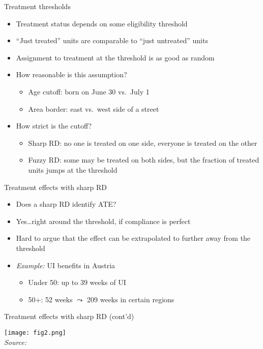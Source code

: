 \documentclass[aspectratio=169,compress,handout,t,xcolor=table]{beamer}
\begin{document}
\begin{frame}{Treatment thresholds}
  \begin{itemize}
    \item Treatment status depends on some eligibility threshold
    \item ``Just treated'' units are comparable to ``just untreated'' units
    \item Assignment to treatment at the threshold is as good as random
    \item How reasonable is this assumption?
    \begin{itemize}
      \item Age cutoff: born on June 30 vs.\ July 1
      \item Area border: east vs.\ west side of a street
    \end{itemize}
    \item How strict is the cutoff?
    \begin{itemize}
      \item Sharp RD: no one is treated on one side, everyone is treated on the other
      \item Fuzzy RD: some may be treated on both sides, but the fraction of treated units jumps at the threshold
    \end{itemize}
  \end{itemize}
\end{frame}

\begin{frame}{Treatment effects with sharp RD}
  \begin{itemize}
    \item Does a sharp RD identify ATE?
    \item Yes\ldots right around the threshold, if compliance is perfect
    \item Hard to argue that the effect can be extrapolated to further away from the threshold
    \item \emph{Example:} UI benefits in Austria \citep*[][JOE]{Lalive2008}
    \begin{itemize}
      \item Under 50: up to 39 weeks of UI
      \item 50+: 52 weeks \(\leadsto\) 209 weeks in certain regions
    \end{itemize}
  \end{itemize}
\end{frame}

\begin{frame}{Treatment effects with sharp RD (cont'd)}
  \begin{center}
    \texttt{[image: fig2.png]} \\
    {\tiny \emph{Source:} \citet*{Lalive2008}}
  \end{center}
\end{frame}
\addtocounter{framenumber}{-1}
\end{document}
